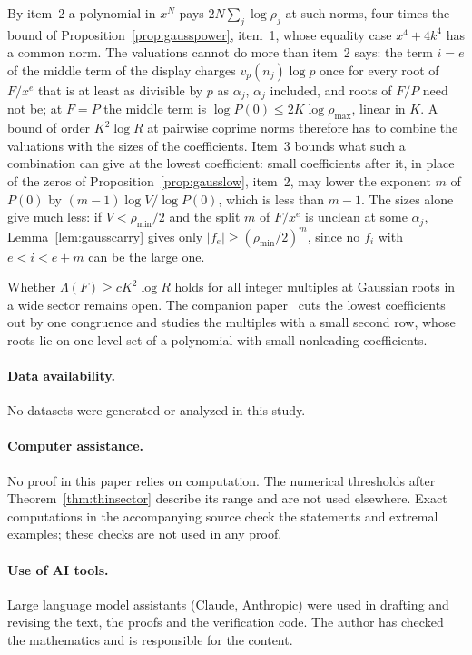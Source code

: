 \documentclass[11pt]{article}
\begin{document}
By item~2 a polynomial in $x^N$ pays $2N\sum_j\log\rho_j$ at such norms, four
times the bound of Proposition~\ref{prop:gausspower}, item~1, whose equality
case $x^4+4k^4$ has a common norm.  The valuations cannot do more than
item~2 says: the term $i=e$ of the middle term of the display charges
$v_p(n_j)\log p$ once for every root of $F/x^e$ that is at least as divisible
by $p$ as $\alpha_j$, $\alpha_j$ included, and roots of $F/P$ need not be; at
$F=P$ the middle term is
$\log P(0)\le2K\log\rho_{\max}$, linear in $K$.  A bound of order
$K^2\log R$ at pairwise coprime norms therefore has to combine the
valuations with the sizes of the coefficients.  Item~3 bounds what such a
combination can give at the lowest coefficient: small coefficients after it,
in place of the zeros of Proposition~\ref{prop:gausslow}, item~2, may lower
the exponent $m$ of $P(0)$ by $(m-1)\log V/\log P(0)$, which is less than
$m-1$.  The sizes alone give much less: if $V<\rho_{\min}/2$ and the split
$m$ of $F/x^e$ is unclean at some $\alpha_j$,
Lemma~\ref{lem:gausscarry} gives only
$|f_e|\ge(\rho_{\min}/2)^m$, since no $f_i$ with $e<i<e+m$ can be the large one.

Whether $\Lambda(F)\ge cK^2\log R$ holds for all integer multiples at
Gaussian roots in a wide sector remains open.  The companion
paper~\cite{coefficient-mass-levelsets} cuts the lowest coefficients out by
one congruence and studies the multiples with a small second row, whose
roots lie on one level set of a polynomial with small nonleading
coefficients.

\paragraph{Data availability.}
No datasets were generated or analyzed in this study.

\paragraph{Computer assistance.}
No proof in this paper relies on computation.  The numerical thresholds after
Theorem~\ref{thm:thinsector} describe its range and are not used elsewhere.
Exact computations in the accompanying source check the statements and
extremal examples; these checks are not used in any proof.

\paragraph{Use of AI tools.}
Large language model assistants (Claude, Anthropic) were used in drafting and
revising the text, the proofs and the verification code.  The author has checked the mathematics and is responsible for
the content.
\end{document}
